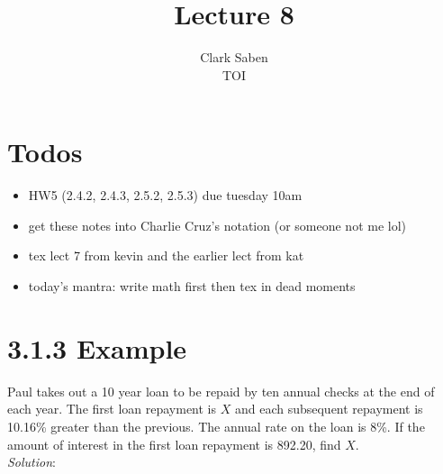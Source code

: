 \documentclass[12pt]{article}
\begin{document}
 
 
\title{Lecture 8}%
\author{Clark Saben\\ %
TOI} %
 
\maketitle

\section{Todos}

\begin{itemize}
	\item HW5 (2.4.2, 2.4.3, 2.5.2, 2.5.3) due tuesday 10am
	\item get these notes into Charlie Cruz's notation (or someone not me lol)
	\item tex lect 7 from kevin and the earlier lect from kat
	\item today's mantra: write math first then tex in dead moments
\end{itemize}

\section{3.1.3 Example}
Paul takes out a 10 year loan to be repaid by ten annual checks at the end of each year.
The first loan repayment is $X$ and each subsequent repayment is 10.16\% greater than
the previous. The annual rate on the loan is 8\%. If the amount of interest in the first
loan repayment is 892.20, find $X$. \\

\emph{Solution}:




 
 
\end{document}
